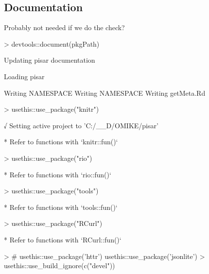 \documentclass[a4paper,12pt]{article}\usepackage[]{graphicx}\usepackage[]{color}
\begin{document}
\subsection{Documentation}
Probably not needed if we do the check?
\begin{Schunk}
\begin{Sinput}
> devtools::document(pkgPath)
\end{Sinput}
\begin{Soutput}
Updating pisar documentation
\end{Soutput}
\begin{Soutput}
Loading pisar
\end{Soutput}
\begin{Soutput}
Writing NAMESPACE
Writing NAMESPACE
Writing getMeta.Rd
\end{Soutput}
\begin{Sinput}
> usethis::use_package("knitr")
\end{Sinput}
\begin{Soutput}
√ Setting active project to 'C:/__D/OMIKE/pisar'
\end{Soutput}
\begin{Soutput}
Warning in if (delta < 0) {: the condition has length > 1 and only the first element will be used
\end{Soutput}
\begin{Soutput}
Warning in if (delta > 0) {: the condition has length > 1 and only the first element will be used
\end{Soutput}
\begin{Soutput}
* Refer to functions with `knitr::fun()`
\end{Soutput}
\begin{Sinput}
> usethis::use_package("rio")
\end{Sinput}
\begin{Soutput}
* Refer to functions with `rio::fun()`
\end{Soutput}
\begin{Sinput}
> usethis::use_package("tools")
\end{Sinput}
\begin{Soutput}
* Refer to functions with `tools::fun()`
\end{Soutput}
\begin{Sinput}
> usethis::use_package("RCurl")
\end{Sinput}
\begin{Soutput}
* Refer to functions with `RCurl::fun()`
\end{Soutput}
\begin{Sinput}
> # usethis::use_package('httr') usethis::use_package('jsonlite')
> usethis::use_build_ignore(c("devel"))
\end{Sinput}
\end{Schunk}
\clearpage
\end{document}
